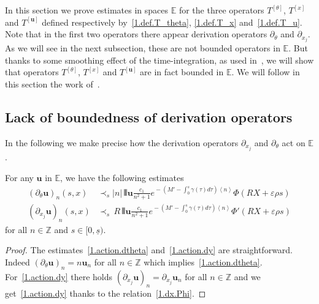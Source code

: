 \documentclass[AHL,Unicode,longabstracts,published]{cedram}
\theoremstyle{plain}
\newcommand*\e{\varepsilon}
\newcommand*\Z{{\mathbb Z}}
\newcommand{\dptl}{\partial}%
\newcommand*\EE{{\mathbb E}}
\newcommand*\g{\gamma}
\newcommand{\ubf}{{\mathbf u}}
\newcommand*\dsp{\displaystyle}
\newcommand*\und{\underline}
\DeclarePairedDelimiter{\VERT}{|\mkern -1.6mu|\mkern -1.6mu|}{|\mkern -1.6mu|\mkern -1.6mu|}
\begin{document}
In this section we prove estimates in spaces $\EE$ for the three operators $T^{[\theta]}$, $T^{[x]}$ and $T^{[\ubf]}$ defined respectively by~\eqref{1.def.T_theta}, \eqref{1.def.T_x} and~\eqref{1.def.T_u}. Note that in the first two operators there appear derivation operators $\dptl_{\theta}$ and $\dptl_{x_j}$. As we will see in the next subsection, these are not bounded operators in $\EE$. But thanks to some smoothing effect of the time-integration, as used in~\cite{metivier2005remarks}, we will show that operators $T^{[\theta]}$, $T^{[x]}$ and $T^{[\ubf]}$ are in fact bounded in $\EE$. We will follow in this section the work of~\cite{ukai2001boltzmann}.



\subsection{Lack of boundedness of derivation operators}


In the following we make precise how the derivation operators $\dptl_{x_j}$ and $\dptl_{\theta}$ act on $\EE$.

\begin{lemm}\label{1.lemma.derivation}
For any $\ubf$ in $\EE$, we have the following estimates
\begin{align}
(\dptl_{\theta}\ubf)_n(s,x) & \prec_{s} |n| \,\VERT{\ubf} \frac{\dsp c_1}{\dsp n^2+1} e^{{}-(M'- \int_{0}^{s}\g(\tau) d\tau) \left<n\right>} \Phi\left(R X+\e\rho s\right) \label{1.action.dtheta}
\\
(\dptl_{x_j}\ubf)_n(s,x) & \prec_{s} \,R \,\VERT{\ubf} \frac{\dsp c_1}{\dsp n^2+1} e^{{}-(M'- \int_{0}^{s}\g(\tau) d\tau) \left<n\right>} \Phi'\left(R X+\e\rho s\right) \label{1.action.dy}
\end{align}
for all $n\in\Z$ and $s\in[0,\und{s})$.
\end{lemm}

\begin{proof}
The estimates~\eqref{1.action.dtheta} and~\eqref{1.action.dy} are straightforward. Indeed $(\dptl_{\theta}\ubf)_n = n \ubf_n $ for all $n\in\Z $ which implies~\eqref{1.action.dtheta}. For~\eqref{1.action.dy} there holds $(\dptl_{x_j}\ubf)_n = \dptl_{x_j} \ubf_n $ for all $ n\in\Z $ and we get~\eqref{1.action.dy} thanks to the relation~\eqref{1.dx.Phi}.
\end{proof}
\end{document}

